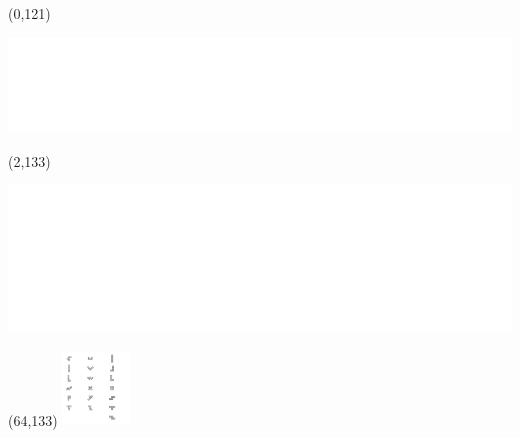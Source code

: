 \documentclass{extarticle}
\begin{document}
\begin{textblock}{92}(0,121)%
\vfill
{\centerline{\noindent\includegraphics[scale=0.666]{tools/cyrillic-v2.pdf}}}
\vfill
\end{textblock}

\begin{textblock}{70}(2,133)%
\vfill
{\centerline{\noindent\includegraphics[scale=0.666]{tools/morse-tree.pdf}}}
\vfill
\end{textblock}

\begin{textblock}{0}(64,133)%
\vfill
{\includegraphics[width=18mm]{tools/xmino.pdf}}
\vfill
\end{textblock}
\end{document}
